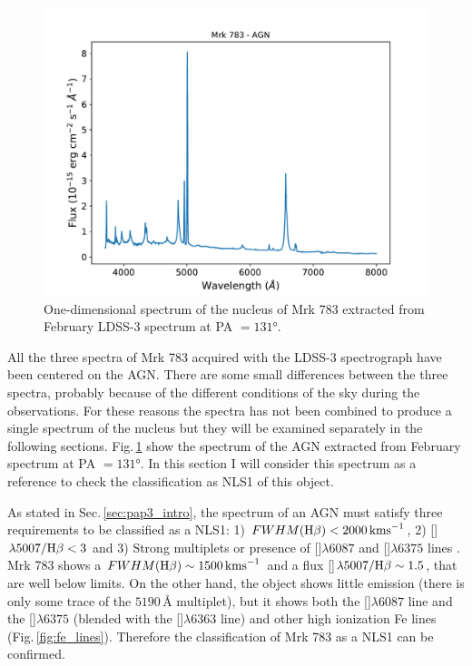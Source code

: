 \documentclass[../main.tex]{subfiles}
\begin{document}
\begin{figure}
\centering
\includegraphics[width=\textwidth]{images/paper3/spectrum_nucleus.pdf} 
\caption[]{One-dimensional spectrum of the nucleus of Mrk 783 extracted from February LDSS-3 spectrum at PA $=\ang{131}$. } 
\label{fig:all_spectra}
\end{figure} 

All the three spectra of Mrk 783 acquired with the LDSS-3 spectrograph have been centered on the AGN.
There are some small differences between the three spectra, probably because of the different conditions of the sky during the observations. 
For these reasons the spectra has not been combined to produce a single spectrum of the nucleus but they will be examined separately in the following sections.
Fig.\,\ref{fig:all_spectra} show the spectrum of the AGN extracted from February spectrum at PA $=\ang{131}$.
In this section I will consider this spectrum as a reference to check the classification as NLS1 of this object.

As stated in Sec.\,\ref{sec:pap3_intro}, the spectrum of an AGN must satisfy three requirements to be classified as a NLS1: 1) $FWHM(\Hb)<2000\,\si{\kms}$, 2) []$\lambda5007/\Hb<3$ \citep{Osterbrock85} and 3) Strong  multiplets or presence of []$\lambda6087$ and []$\lambda6375$ lines \citep{Goodrich89}.
Mrk 783 shows a $FWHM(\Hb)\sim1500\,\si{\kms}$ and a flux []$\lambda5007/\Hb\sim 1.5$, that are well below \citet{Osterbrock85} limits.
On the other hand, the object shows little  emission (there is only some trace of the $5190\,\si{\angstrom}$ multiplet), but it shows both the []$\lambda6087$ line and the []$\lambda6375$ (blended with the []$\lambda6363$ line) and other high ionization Fe lines (Fig.\,\ref{fig:fe_lines}).
Therefore the classification of Mrk 783 as a NLS1 can be confirmed.
\end{document}
